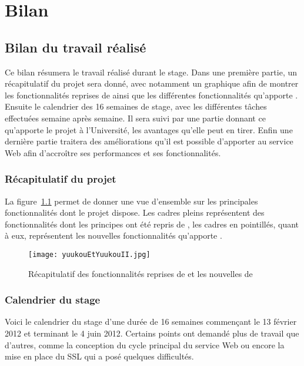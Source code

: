 \chapter{Bilan}

\section{Bilan du travail r\'ealis\'e}

Ce bilan r\'esumera le travail r\'ealis\'e durant le stage.
Dans une premi\`ere partie, un r\'ecapitulatif du projet sera donn\'e, avec notamment un graphique afin de montrer les fonctionnalit\'es reprises de {\Yuukou} ainsi que les diff\'erentes fonctionnalit\'es qu'apporte {\YuukouII}.
Ensuite le calendrier des 16 semaines de stage, avec les diff\'erentes t\^aches effectu\'ees semaine apr\`es semaine.
Il sera suivi par une partie donnant ce qu'apporte le projet \`a l'Universit\'e, les avantages qu'elle peut en tirer.
Enfin une derni\`ere partie traitera des am\'eliorations qu'il est possible d'apporter au service Web afin d'accro\^itre ses performances et ses fonctionnalit\'es.

\subsection{R\'ecapitulatif du projet}

La figure~\ref{figure:yuukouEtYuukouII} permet de donner une vue d'ensemble sur les principales fonctionnalit\'es dont le projet dispose.
Les cadres pleins repr\'esentent des fonctionnalit\'es dont les principes ont \'et\'e repris de {\Yuukou}, les cadres en pointill\'es, quant \`a eux, repr\'esentent les nouvelles fonctionnalit\'es qu'apporte \YuukouII.

\clearpage

\begin{figure}[!ht]
	\centering
	\texttt{[image: yuukouEtYuukouII.jpg]}
	\caption{R\'ecapitulatif des fonctionnalit\'es reprises de {\Yuukou} et les nouvelles de \YuukouII}
	\label{figure:yuukouEtYuukouII}

\end{figure}

\subsection{Calendrier du stage}

Voici le calendrier du stage d'une dur\'ee de 16 semaines commen\c{c}ant le 13 f\'evrier 2012 et terminant le 4 juin 2012.
Certains points ont demand\'e plus de travail que d'autres, comme la conception du cycle principal du service Web ou encore la mise en place du SSL qui a pos\'e quelques difficult\'es.

